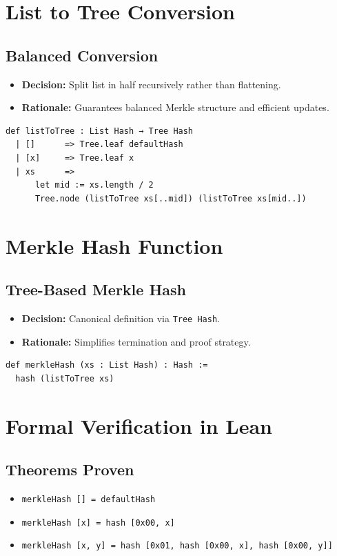 \documentclass{article}
\begin{document}
\section{List to Tree Conversion}

\subsection*{Balanced Conversion}
\begin{itemize}[noitemsep]
  \item \textbf{Decision:} Split list in half recursively rather than flattening.
  \item \textbf{Rationale:} Guarantees balanced Merkle structure and efficient updates.
\end{itemize}

\begin{lstlisting}[language=Lean]
def listToTree : List Hash → Tree Hash
  | []      => Tree.leaf defaultHash
  | [x]     => Tree.leaf x
  | xs      =>
      let mid := xs.length / 2
      Tree.node (listToTree xs[..mid]) (listToTree xs[mid..])
\end{lstlisting}

\section{Merkle Hash Function}

\subsection*{Tree-Based Merkle Hash}
\begin{itemize}[noitemsep]
  \item \textbf{Decision:} Canonical definition via \texttt{Tree Hash}.
  \item \textbf{Rationale:} Simplifies termination and proof strategy.
\end{itemize}

\begin{lstlisting}[language=Lean]
def merkleHash (xs : List Hash) : Hash :=
  hash (listToTree xs)
\end{lstlisting}

\section{Formal Verification in Lean}

\subsection*{Theorems Proven}
\begin{itemize}[noitemsep]
  \item \texttt{merkleHash [] = defaultHash}
  \item \texttt{merkleHash [x] = hash [0x00, x]}
  \item \texttt{merkleHash [x, y] = hash [0x01, hash [0x00, x], hash [0x00, y]]}
\end{itemize}
\end{document}
